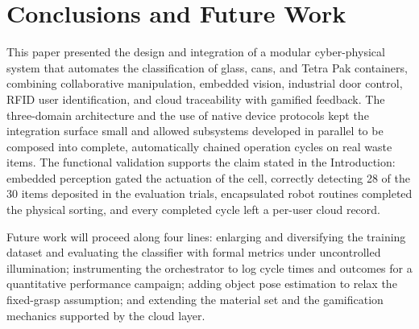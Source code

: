 \documentclass[conference]{IEEEtran}
\begin{document}
\section{Conclusions and Future Work}
This paper presented the design and integration of a modular cyber-physical system that automates the classification of glass, cans, and Tetra Pak containers, combining collaborative manipulation, embedded vision, industrial door control, RFID user identification, and cloud traceability with gamified feedback. The three-domain architecture and the use of native device protocols kept the integration surface small and allowed subsystems developed in parallel to be composed into complete, automatically chained operation cycles on real waste items. The functional validation supports the claim stated in the Introduction: embedded perception gated the actuation of the cell, correctly detecting 28 of the 30 items deposited in the evaluation trials, encapsulated robot routines completed the physical sorting, and every completed cycle left a per-user cloud record.

Future work will proceed along four lines: enlarging and diversifying the training dataset and evaluating the classifier with formal metrics under uncontrolled illumination; instrumenting the orchestrator to log cycle times and outcomes for a quantitative performance campaign; adding object pose estimation to relax the fixed-grasp assumption; and extending the material set and the gamification mechanics supported by the cloud layer.

\end{document}
